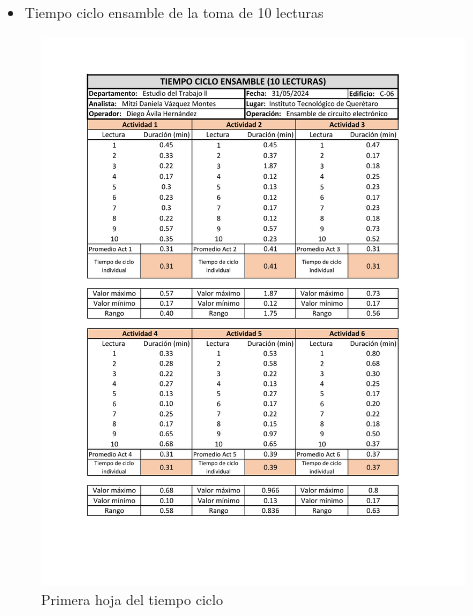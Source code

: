     \begin{itemize}
        \item Tiempo ciclo ensamble de la toma de 10 lecturas
    \end{itemize}
    
    \begin{figure}[H]
        \centering
        \includegraphics[trim = {1mm 1mm 1mm 1mm},clip,scale=0.45]{34/img/tiempoCicloEnsamble10Lecturas1.pdf}
        \caption{Primera hoja del tiempo ciclo}
        \label{fig:tiempoCicloEnsamble10Lecturas1}
    \end{figure}
    
